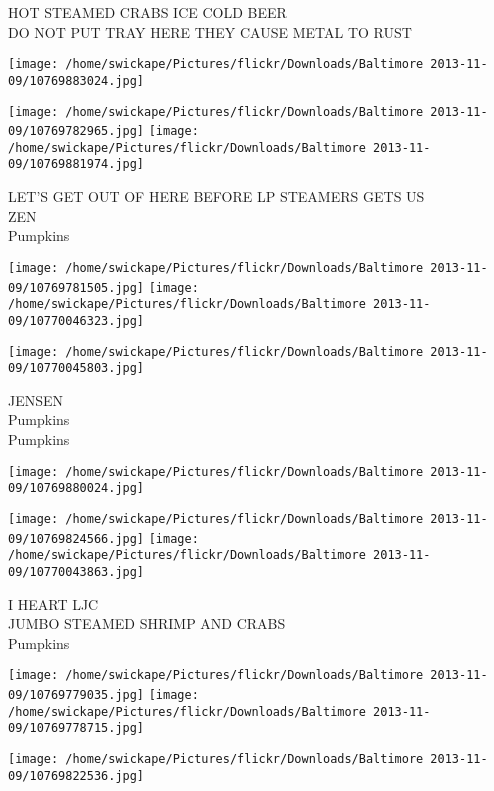 \documentclass[10pt,letterpaper]{article}
\begin{document}
HOT STEAMED CRABS ICE COLD BEER\\
DO NOT PUT TRAY HERE THEY CAUSE METAL TO RUST\\
\pagebreak

\texttt{[image: /home/swickape/Pictures/flickr/Downloads/Baltimore 2013-11-09/10769883024.jpg]}

\vspace{0.25in}
\texttt{[image: /home/swickape/Pictures/flickr/Downloads/Baltimore 2013-11-09/10769782965.jpg]}
\texttt{[image: /home/swickape/Pictures/flickr/Downloads/Baltimore 2013-11-09/10769881974.jpg]}

LET'S GET OUT OF HERE BEFORE LP STEAMERS GETS US\\
ZEN\\
Pumpkins\\
\pagebreak

\texttt{[image: /home/swickape/Pictures/flickr/Downloads/Baltimore 2013-11-09/10769781505.jpg]}
\texttt{[image: /home/swickape/Pictures/flickr/Downloads/Baltimore 2013-11-09/10770046323.jpg]}

\texttt{[image: /home/swickape/Pictures/flickr/Downloads/Baltimore 2013-11-09/10770045803.jpg]}

JENSEN\\
Pumpkins\\
Pumpkins\\
\pagebreak

\texttt{[image: /home/swickape/Pictures/flickr/Downloads/Baltimore 2013-11-09/10769880024.jpg]}

\vspace{0.25in}
\texttt{[image: /home/swickape/Pictures/flickr/Downloads/Baltimore 2013-11-09/10769824566.jpg]}
\texttt{[image: /home/swickape/Pictures/flickr/Downloads/Baltimore 2013-11-09/10770043863.jpg]}

I HEART LJC\\
JUMBO STEAMED SHRIMP AND CRABS\\
Pumpkins\\
\pagebreak

\texttt{[image: /home/swickape/Pictures/flickr/Downloads/Baltimore 2013-11-09/10769779035.jpg]}
\texttt{[image: /home/swickape/Pictures/flickr/Downloads/Baltimore 2013-11-09/10769778715.jpg]}

\vspace{0.25in}
\texttt{[image: /home/swickape/Pictures/flickr/Downloads/Baltimore 2013-11-09/10769822536.jpg]}
\end{document}
